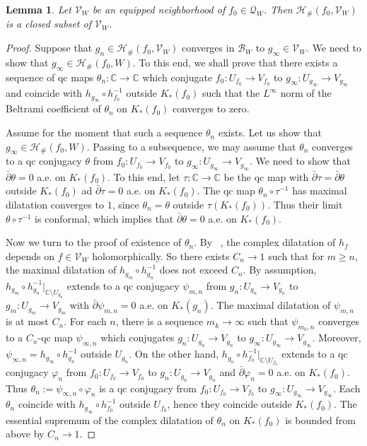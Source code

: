 \documentclass{amsart}
\numberwithin{equation}{section}
\newtheorem{lemma}[theorem]{Lemma}%
\newcommand{\C}{\mathbb C}
\theoremstyle{definition}
\theoremstyle{remark}
\begin{document}
\begin{lemma}\label{lem:closedH}
Let $\mathcal{V}_W$ be an equipped neighborhood of $f_0\in \mathcal{Q}_W$. Then 
$\mathcal{H}_\#(f_0,\mathcal{V}_W)$ is a closed subset of $\mathcal{V}_W$.
\end{lemma}
\begin{proof} Suppose that $g_n\in \mathcal{H}_\# (f_0,\mathcal{V}_W)$ converges in $\mathcal{B}_W$ to $g_\infty\in \mathcal{V}_W$. We need to show that $g_\infty\in \mathcal{H}_\# (f_0,W)$. To this end, we shall prove that there exists a sequence of qc maps $\theta_n:\C\to \C$ which conjugate 
$f_0:U_{f_0}\to V_{f_0}$ to $g_\infty:U_{g_\infty}\to V_{g_\infty}$ and coincide with $h_{g_\infty}\circ h_{f_0}^{-1}$ outside $K_*(f_0)$ such that the $L^\infty$ norm of the Beltrami coefficient of $\theta_n$ on $K_*(f_0)$ converges to zero. 

Assume for the moment that such a sequence $\theta_n$ exists. Let us show that $g_\infty\in \mathcal{H}_\#(f_0,W)$. Passing to a subsequence, we may assume that $\theta_n$ converges to a qc conjugacy $\theta$ from $f_0:U_{f_0}\to V_{f_0}$ to $g_\infty:U_{g_\infty}\to V_{g_\infty}$. We need to show that $\bar{\partial} \theta=0$ a.e. on $K_*(f_0)$. To this end, let $\tau:\C\to\C$ be the qc map with $\bar{\partial}\tau=\bar{\partial }\theta$ outside $K_*(f_0)$ ad $\bar{\partial }\tau=0$ a.e. on $K_*(f_0)$. The qc map $\theta_n\circ \tau^{-1}$ has maximal dilatation converges to $1$, since $\theta_n=\theta$ outside $\tau(K_*(f_0))$. Thus their limit $\theta\circ\tau^{-1}$ is conformal, which implies that $\bar{\partial}\theta=0$ a.e. on $K_*(f_0)$.  

Now we turn to the proof of existence of $\theta_n$. By ~\cite{BR}, the complex dilatation of $h_f$ depends on $f\in \mathcal{V}_W$ holomorphically. So there exists $C_n\to 1$ such that for $m\ge n$, 
the maximal dilatation of $h_{g_m}\circ h_{g_n}^{-1}$ does not exceed $C_n$. By assumption, $h_{g_m}\circ h_{g_n}^{-1}|_{\C\setminus U_{g_n}}$ extends to a qc conjugacy $\psi_{m,n}$ from $g_n:U_{g_n}\to V_{g_n}$ to $g_m:U_{g_m}\to V_{g_m}$ with $\bar{\partial} \psi_{m,n}=0$ a.e. on $K_*(g_n)$. The maximal dilatation of $\psi_{m,n}$ is at most $C_n$. 
For each $n$, there is a sequence $m_k\to\infty$ such that $\psi_{m_k,n}$ converges to a $C_n$-qc map $\psi_{\infty, n}$ which conjugates $g_n: U_{g_n}\to V_{g_n}$ to $g_\infty: U_{g_{\infty}} \to V_{g_{\infty}}$. Moreover, $\psi_{\infty,n}=h_{g_\infty}\circ h_{g_n}^{-1}$ outside $U_{g_n}$. 
On the other hand, $h_{g_n}\circ h_{f_0}^{-1}|_{\C\setminus U_{f_0}}$ extends to a qc conjugacy $\varphi_n$ from $f_0:U_{f_0}\to V_{f_0}$ to $g_n: U_{g_n}\to V_{g_n}$ and $\bar{\partial} \varphi_n=0$ a.e. on $K_*(f_0)$.  Thus $\theta_n:=\psi_{\infty,n}\circ \varphi_n$ is a qc conjugacy from $f_0:U_{f_0}\to V_{f_0}$ to $g_\infty: U_{g_\infty}\to V_{g_\infty}$. Each $\theta_n$ coincide with $h_{g_\infty}\circ h_{f_0}^{-1}$ outside $U_{f_0}$, hence they coincide outside $K_*(f_0)$. The essential supremum of the complex dilatation of $\theta_n$ on $K_*(f_0)$ is bounded from above by $C_n\to 1$.
\end{proof}
\end{document}
